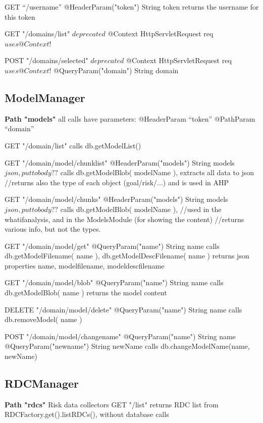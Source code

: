 	GET ``/username''
	@HeaderParam("token") String token
	returns the username for this token
	
	GET "/domains/list"  $deprecated$
	@Context HttpServletRequest req   $uses @Context$!
	
	POST "/domains/selected" $deprecated$
	@Context HttpServletRequest req   $uses @Context$!
	@QueryParam("domain") String domain
	
\subsection{ModelManager}

\textbf{Path "models"}
all calls have parameters: 
    @HeaderParam ``token''
    @PathParam ``domain''
    
    GET "/{domain}/list"
      calls db.getModelList()
      
     GET "/{domain}/model/chunklist" 
     @HeaderParam("models") String models   $json, put to body??$
     calls db.getModelBlob( modelName ), extracts all data to json
     //returns also the type of each object (goal/risk/...) and is used in AHP
	
     GET "/{domain}/model/chunks" 
     @HeaderParam("models") String models  $json, put to body??$
      calls db.getModelBlob( modelName ),
      //used in the whatifanalysis, and in the ModelsModule (for showing the content)
      //returns various info, but not the types.
      
      GET "/{domain}/model/get"
      @QueryParam("name") String name 
      calls db.getModelFilename( name ), db.getModelDescFilename( name )
      returns json properties name, modelfilename, modeldescfilename
      
      GET "/{domain}/model/blob"
      @QueryParam("name") String name 
      calls db.getModelBlob( name )
      returns the model content
     
     DELETE "/{domain}/model/delete"
     @QueryParam("name") String name 
      calls db.removeModel( name )
      
      POST "/{domain}/model/changename"
	@QueryParam("name") String name 
	@QueryParam("newname") String newName 
	calls db.changeModelName(name, newName)
     
\subsection{RDCManager}
   
\textbf{Path "rdcs"} Risk data collectors
	GET "/list"
	returns RDC list from RDCFactory.get().listRDCs(), without database calls
	
